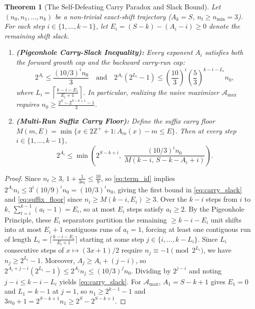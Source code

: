 \documentclass[11pt, a4paper]{amsart}
\newtheorem{theorem}{Theorem}[section]
\theoremstyle{definition}
\newcommand{\Z}{\mathbb{Z}}
\newcommand{\A}{\mathcal{A}}
\begin{document}
\begin{theorem}[The Self-Defeating Carry Paradox and Slack Bound]\label{thm:carry_paradox}
Let $(n_0, n_1, \dots, n_k)$ be a non-trivial exact-shift trajectory ($A_k = S$, $n_t \ge n_{\min} = 3$). For each step $i \in \{1, \dots, k-1\}$, let $E_i = (S - k) - (A_i - i) \ge 0$ denote the remaining shift slack.
\begin{enumerate}
    \item \textbf{(Pigeonhole Carry-Slack Inequality):} Every exponent $A_i$ satisfies both the forward growth cap and the backward carry-run cap:
    \begin{equation}\label{eq:carry_slack}
    2^{A_i} \le \frac{(10/3)^i n_0}{3} \quad \text{and} \quad 2^{A_i} \left(2^{L_i} - 1\right) \le \left(\frac{10}{3}\right)^i \left(\frac{5}{3}\right)^{k - i - L_i} n_0,
    \end{equation}
    where $L_i = \left\lceil \frac{k - i - E_i}{E_i + 1} \right\rceil$. In particular, realizing the naive maximizer $\A_{\max}$ requires $n_0 \ge \frac{2^S - 2^{S-k+1} - 1}{3}$.
    \item \textbf{(Multi-Run Suffix Carry Floor):} Define the suffix carry floor $M(m, E) = \min \{ x \in 2\Z^+ + 1 : A_m(x) - m \le E \}$. Then at every step $i \in \{1, \dots, k-1\}$,
    \begin{equation}\label{eq:suffix_floor}
    2^{A_i} \le \min \left( 2^{S-k+i}, \; \frac{(10/3)^i n_0}{M(k - i, \, S - k - A_i + i)} \right).
    \end{equation}
\end{enumerate}
\end{theorem}

\begin{proof}
Since $n_t \ge 3$, $1 + \frac{1}{3n_t} \le \frac{10}{9}$, so \eqref{eq:term_id} implies $2^{A_i} n_i \le 3^i (10/9)^i n_0 = (10/3)^i n_0$, giving the first bound in \eqref{eq:carry_slack} and \eqref{eq:suffix_floor} since $n_i \ge M(k-i, E_i) \ge 3$. Over the $k-i$ steps from $i$ to $k$, $\sum_{t=i}^{k-1}(a_t - 1) = E_i$, so at most $E_i$ steps satisfy $a_t \ge 2$. By the Pigeonhole Principle, these $E_i$ separators partition the remaining $\ge k - i - E_i$ unit shifts into at most $E_i + 1$ contiguous runs of $a_t = 1$, forcing at least one contiguous run of length $L_i = \lceil \frac{k-i-E_i}{E_i+1} \rceil$ starting at some step $j \in \{i, \dots, k - L_i\}$. Since $L_i$ consecutive steps of $x \mapsto (3x+1)/2$ require $n_j \equiv -1 \pmod{2^{L_i}}$, we have $n_j \ge 2^{L_i} - 1$. Moreover, $A_j \ge A_i + (j - i)$, so $2^{A_i + j - i}(2^{L_i} - 1) \le 2^{A_j} n_j \le (10/3)^j n_0$. Dividing by $2^{j-i}$ and noting $j - i \le k - i - L_i$ yields \eqref{eq:carry_slack}. For $\A_{\max}$, $A_1 = S - k + 1$ gives $E_1 = 0$ and $L_1 = k - 1$ at $j = 1$, so $n_1 \ge 2^{k-1} - 1$ and $3n_0 + 1 = 2^{S-k+1} n_1 \ge 2^S - 2^{S-k+1}$.
\end{proof}
\end{document}
